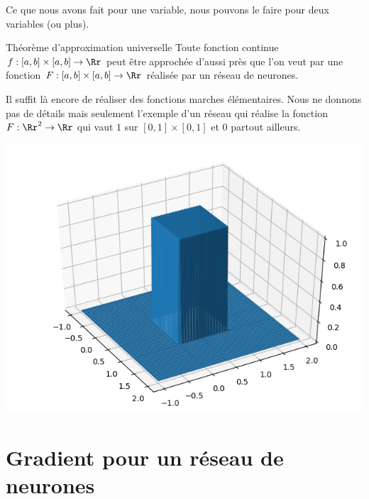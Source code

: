 Ce que nous avons fait pour une variable, nous pouvons le faire pour deux variables (ou plus).

\begin{theoreme}{Théorème d'approximation universelle}{}
	Toute fonction continue $f : [a,b]\times [a,b] \to \Rr$ peut être approchée d'aussi près que l'on veut par une fonction $F : [a,b]\times [a,b] \to \Rr$ réalisée par un réseau de neurones.
\end{theoreme}

Il suffit là encore de réaliser des fonctions marches élémentaires. Nous ne donnons pas de détails mais seulement l'exemple d'un réseau qui réalise la fonction
$F : \Rr^2 \to \Rr$ qui vaut $1$ sur $[0,1]\times [0,1]$ et $0$ partout ailleurs.





\begin{center}
	\begin{minipage}{0.45\textwidth}
	\end{minipage}
	\begin{minipage}{0.45\textwidth}
		\includegraphics[scale=\myscale,scale=0.5]{figures/neurones-surface-1}
	\end{minipage}
\end{center}


\section{Gradient pour un réseau de neurones}


